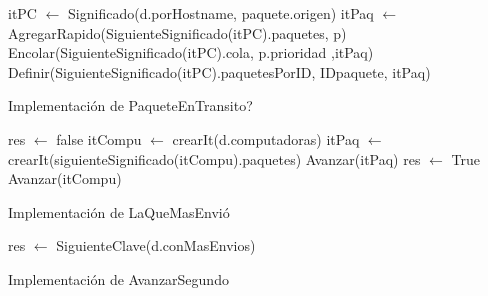 \begin{Algoritmos}
\begin{algorithm}
\begin{algorithmic}[0]
\EndFunction
\end{algorithmic}
\end{algorithm}

\begin{algorithm}
\caption{}
\begin{algorithmic}[0]
	\State itPC $\gets$ Significado(d.porHostname, paquete.origen)
	\State itPaq $\gets$ AgregarRapido(SiguienteSignificado(itPC).paquetes, p)
	\State Encolar(SiguienteSignificado(itPC).cola, p.prioridad ,itPaq)	
	\State Definir(SiguienteSignificado(itPC).paquetesPorID, IDpaquete, itPaq) 
\EndFunction
\end{algorithmic}
\end{algorithm}

\begin{algorithm}
\caption{Implementaci\'on de PaqueteEnTransito?}
\begin{algorithmic}[0]
	\State res $\gets$ false 
	\State itCompu $\gets$ crearIt(d.computadoras) 
		\newline  {}
		\State itPaq $\gets$ crearIt(siguienteSignificado(itCompu).paquetes) 
			\State Avanzar(itPaq)  
		\EndWhile
		 
			\State res $\gets$ True 
		\EndIf
		\State Avanzar(itCompu) 
	\EndWhile
\EndFunction
\end{algorithmic}
\end{algorithm}

\begin{algorithm}
\caption{Implementaci\'on de LaQueMasEnvi\'o}
\begin{algorithmic}[0]
	\State res $\gets$ SiguienteClave(d.conMasEnvios)	
\EndFunction
\end{algorithmic}
\end{algorithm}

\begin{algorithm}
\caption{Implementaci\'on de AvanzarSegundo}
\begin{algorithmic}[0]


\end{algorithmic}
\end{algorithm}
\end{Algoritmos}
